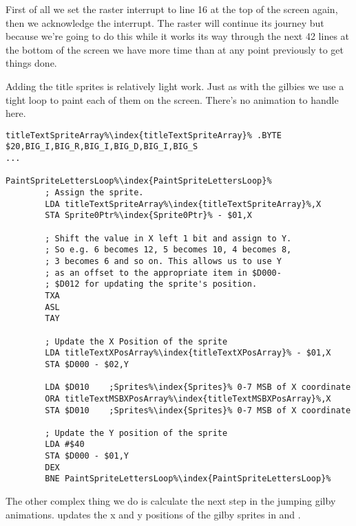First of all we set the raster interrupt to line 16 at the top of the screen again, then we acknowledge the interrupt. The
raster will continue its journey but because we're going to do this while it works its way through the next 42 lines at the bottom 
of the screen we have more time than at any point previously to get things done.

Adding the title sprites is relatively light work. Just as with the gilbies we use a tight loop to paint each of them
on the screen. There's no animation to handle here.

\begin{lstlisting}[escapechar=\%]
titleTextSpriteArray%\index{titleTextSpriteArray}% .BYTE $20,BIG_I,BIG_R,BIG_I,BIG_D,BIG_I,BIG_S
...

PaintSpriteLettersLoop%\index{PaintSpriteLettersLoop}%   
        ; Assign the sprite.
        LDA titleTextSpriteArray%\index{titleTextSpriteArray}%,X
        STA Sprite0Ptr%\index{Sprite0Ptr}% - $01,X

        ; Shift the value in X left 1 bit and assign to Y.
        ; So e.g. 6 becomes 12, 5 becomes 10, 4 becomes 8,
        ; 3 becomes 6 and so on. This allows us to use Y
        ; as an offset to the appropriate item in $D000-
        ; $D012 for updating the sprite's position.
        TXA
        ASL
        TAY

        ; Update the X Position of the sprite
        LDA titleTextXPosArray%\index{titleTextXPosArray}% - $01,X
        STA $D000 - $02,Y

        LDA $D010    ;Sprites%\index{Sprites}% 0-7 MSB of X coordinate
        ORA titleTextMSBXPosArray%\index{titleTextMSBXPosArray}%,X
        STA $D010    ;Sprites%\index{Sprites}% 0-7 MSB of X coordinate

        ; Update the Y position of the sprite
        LDA #$40
        STA $D000 - $01,Y
        DEX
        BNE PaintSpriteLettersLoop%\index{PaintSpriteLettersLoop}%

\end{lstlisting}

The other complex thing we do is calculate the next step in the jumping gilby animations. 
updates the x and y positions of the gilby sprites in  and .

